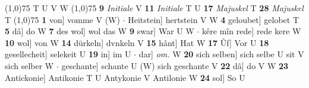 \documentclass[8pt,a4paper,notitlepage]{article}
\begin{document}
\begin{table}[ht]
\begin{minipage}[t]{0.5\linewidth}
\begin{tabular}{rl}
\end{tabular}
\scriptsize
\line(1,0){75} \newline
T U V W \newline
\line(1,0){75} \newline
\textbf{9} \textit{Initiale} V  \textbf{11} \textit{Initiale} T U  \textbf{17} \textit{Majuskel} T  \textbf{28} \textit{Majuskel} T  \newline
\line(1,0){75} \newline
\textbf{1} von] vomme V (W)  $\cdot$ Heitstein] hertstein V W \textbf{4} geloubet] gelobet T \textbf{5} dâ] do W \textbf{7} des wol] wol das W \textbf{9} swar] War U W  $\cdot$ kêre mîn rede] rede kere W \textbf{10} wol] von W \textbf{14} dürkeln] dvnkeln V \textbf{15} hânt] Hat W \textbf{17} Ûf] Vor U \textbf{18} gesellecheit] selekeit U \textbf{19} in] im U  $\cdot$ dar] \textit{om.} W \textbf{20} sich selben] sich selbe U sit V sich selber W  $\cdot$ geschante] schante U (W) sich geschante V \textbf{22} dâ] do V W \textbf{23} Antickonie] Antikonie T U Antykonie V Antilonie W \textbf{24} sol] So U \newline
\end{minipage}
\end{table}
\end{document}
